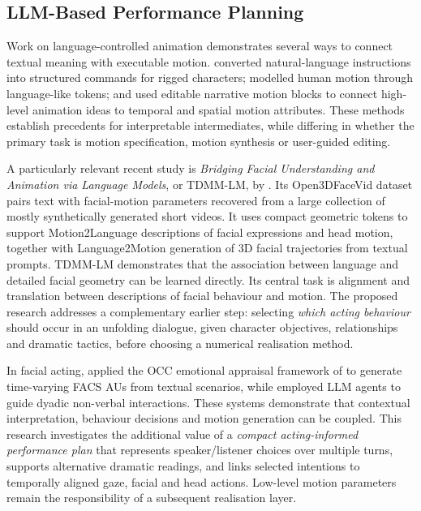 \documentclass[11pt,a4paper]{article}
\begin{document}
\subsection{LLM-Based Performance Planning}

Work on language-controlled animation demonstrates several ways to connect textual meaning with executable motion. \citet{huang2023rigllm} converted natural-language instructions into structured commands for rigged characters; \citet{jiang2023motiongpt} modelled human motion through language-like tokens; and \citet{bourgault2025narrative} used editable narrative motion blocks to connect high-level animation ideas to temporal and spatial motion attributes. These methods establish precedents for interpretable intermediates, while differing in whether the primary task is motion specification, motion synthesis or user-guided editing.

A particularly relevant recent study is \emph{Bridging Facial Understanding and Animation via Language Models}, or TDMM-LM, by \citet{song2026tdmm}. Its Open3DFaceVid dataset pairs text with facial-motion parameters recovered from a large collection of mostly synthetically generated short videos. It uses compact geometric tokens to support Motion2Language descriptions of facial expressions and head motion, together with Language2Motion generation of 3D facial trajectories from textual prompts. TDMM-LM demonstrates that the association between language and detailed facial geometry can be learned directly. Its central task is alignment and translation between descriptions of facial behaviour and motion. The proposed research addresses a complementary earlier step: selecting \emph{which acting behaviour} should occur in an unfolding dialogue, given character objectives, relationships and dramatic tactics, before choosing a numerical realisation method.

In facial acting, \citet{durupinar2025prompt} applied the OCC emotional appraisal framework of \citet{ortony1988cognitive} to generate time-varying FACS AUs from textual scenarios, while \citet{zhang2025socialagent} employed LLM agents to guide dyadic non-verbal interactions. These systems demonstrate that contextual interpretation, behaviour decisions and motion generation can be coupled. This research investigates the additional value of a \emph{compact acting-informed performance plan} that represents speaker/listener choices over multiple turns, supports alternative dramatic readings, and links selected intentions to temporally aligned gaze, facial and head actions. Low-level motion parameters remain the responsibility of a subsequent realisation layer.
\end{document}
